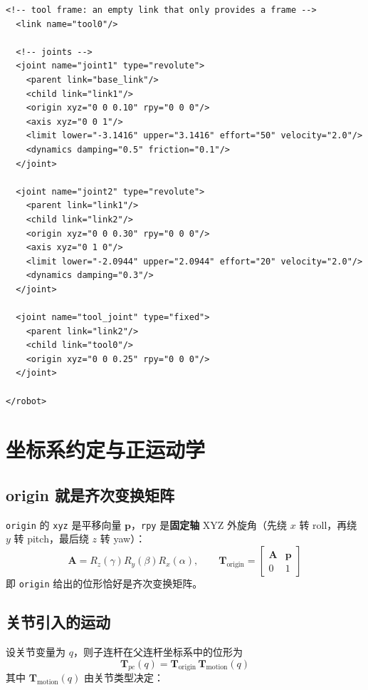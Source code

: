 \begin{lstlisting}[style=xml]
  <!-- tool frame: an empty link that only provides a frame -->
  <link name="tool0"/>

  <!-- joints -->
  <joint name="joint1" type="revolute">
    <parent link="base_link"/>
    <child link="link1"/>
    <origin xyz="0 0 0.10" rpy="0 0 0"/>
    <axis xyz="0 0 1"/>
    <limit lower="-3.1416" upper="3.1416" effort="50" velocity="2.0"/>
    <dynamics damping="0.5" friction="0.1"/>
  </joint>

  <joint name="joint2" type="revolute">
    <parent link="link1"/>
    <child link="link2"/>
    <origin xyz="0 0 0.30" rpy="0 0 0"/>
    <axis xyz="0 1 0"/>
    <limit lower="-2.0944" upper="2.0944" effort="20" velocity="2.0"/>
    <dynamics damping="0.3"/>
  </joint>

  <joint name="tool_joint" type="fixed">
    <parent link="link2"/>
    <child link="tool0"/>
    <origin xyz="0 0 0.25" rpy="0 0 0"/>
  </joint>

</robot>
\end{lstlisting}

\section{坐标系约定与正运动学}

\subsection{origin 就是齐次变换矩阵}

\texttt{origin} 的 \texttt{xyz} 是平移向量 $\boldsymbol{p}$，\texttt{rpy} 是\textbf{固定轴} XYZ 外旋角（先绕 $x$ 转 roll，再绕 $y$ 转 pitch，最后绕 $z$ 转 yaw）：
\begin{equation}
	\label{eq:URDF:RPY}
	\boldsymbol{A}=R_{z}(\gamma)R_{y}(\beta)R_{x}(\alpha),\qquad
	\boldsymbol{T}_{\text{origin}}=\begin{bmatrix}
		\boldsymbol{A} & \boldsymbol{p}\\
		0 & 1
	\end{bmatrix}
\end{equation}
即 \texttt{origin} 给出的位形恰好是齐次变换矩阵。

\subsection{关节引入的运动}

设关节变量为 $q$，则子连杆在父连杆坐标系中的位形为
\begin{equation}
	\label{eq:URDF:关节变换}
	\boldsymbol{T}_{pc}(q)=\boldsymbol{T}_{\text{origin}}\,\boldsymbol{T}_{\text{motion}}(q)
\end{equation}
其中 $\boldsymbol{T}_{\text{motion}}(q)$ 由关节类型决定：

